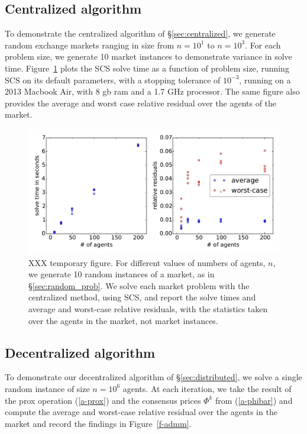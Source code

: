 \documentclass[12pt]{article}
\begin{document}
\subsection{Centralized algorithm}
\label{sec:centralized_examples}
To demonstrate the centralized algorithm of \S\ref{sec:centralized},
we generate random exchange markets ranging in size
from $n=10^1$ to $n=10^3$.
For each problem size, we generate 10 market instances to demonstrate
variance in solve time.
Figure~\ref{f-cvxpy}
plots the SCS solve time as a function of problem size, running
SCS on its default parameters, with a stopping tolerance of $10^{-3}$,
running on a 2013 Macbook Air, with 8 gb ram and a 1.7 GHz processor.
The same figure also provides the average and worst case relative residual over the agents of the market.


\begin{figure}
\begin{center}
\includegraphics[width=1.0\textwidth]{figures/cvxpy}
\end{center}
\caption{XXX temporary figure. For different values of numbers of agents, $n$,
we generate 10 random instances of a market, as in \S\ref{sec:random_prob}. We solve each market problem with the centralized method, using SCS, and report the solve times and average and worst-case relative residuals, with the statistics taken over the agents in the market, not market instances.}
\label{f-cvxpy}
\end{figure}


\subsection{Decentralized algorithm}
To demonstrate our decentralized algorithm of \S\ref{sec:distributed},
we solve a single random instance of size $n=10^6$ agents.
At each iteration, we take the result of the prox operation (\ref{a-prox}) and the consensus prices $\Phi^k$ from (\ref{a-phibar}) and compute
the average and worst-case relative residual over the agents in the market
and record the findings
in Figure~\ref{f-admm}.
\end{document}
